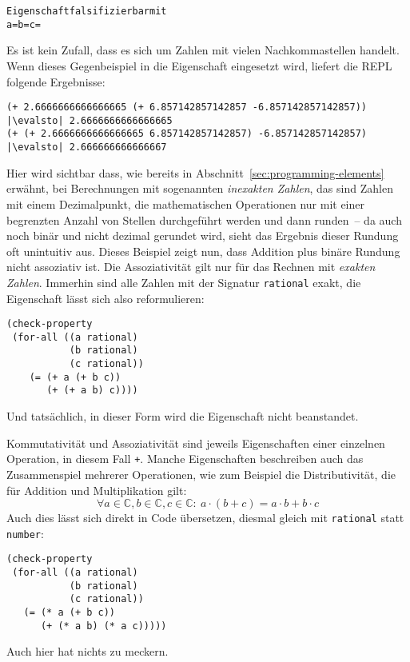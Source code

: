%
\begin{alltt}
Eigenschaft falsifizierbar mit
  a =  b =  c = 
\end{alltt}
%
Es ist kein Zufall, dass es sich um Zahlen mit vielen Nachkommastellen
handelt.  Wenn dieses Gegenbeispiel in die Eigenschaft eingesetzt
wird, liefert die REPL folgende Ergebnisse:
%
\begin{lstlisting}
(+ 2.6666666666666665 (+ 6.857142857142857 -6.857142857142857))
|\evalsto| 2.6666666666666665
(+ (+ 2.6666666666666665 6.857142857142857) -6.857142857142857)
|\evalsto| 2.666666666666667
\end{lstlisting}
%
Hier wird sichtbar dass, wie bereits in
Abschnitt~\ref{sec:programming-elements} erwähnt, bei Berechnungen mit
sogenannten \textit{inexakten Zahlen}, das sind
Zahlen mit einem Dezimalpunkt, die mathematischen Operationen nur mit
einer begrenzten Anzahl von Stellen durchgeführt werden und dann runden~-- da
auch noch binär und nicht dezimal gerundet wird, sieht das Ergebnis
dieser Rundung oft unintuitiv aus.  Dieses Beispiel zeigt nun, dass
Addition plus binäre Rundung nicht assoziativ ist.  Die Assoziativität
gilt nur für das Rechnen mit \textit{exakten Zahlen}.  Immerhin sind alle Zahlen mit der Signatur
\lstinline{rational} exakt, die
Eigenschaft lässt sich also reformulieren:
%
\begin{lstlisting}
(check-property
 (for-all ((a rational)
           (b rational)
           (c rational))
    (= (+ a (+ b c))
       (+ (+ a b) c))))
\end{lstlisting}
%
Und tatsächlich, in dieser Form wird die Eigenschaft nicht
beanstandet.

Kommutativität und Assoziativität sind jeweils Eigenschaften einer
einzelnen Operation, in diesem Fall \lstinline{+}.  Manche Eigenschaften
beschreiben auch das Zusammenspiel mehrerer Operationen, wie zum
Beispiel die Distributivität, die für Addition und Multiplikation
gilt:
%
\begin{displaymath}
\forall a \in \mathbb{C}, b \in \mathbb{C}, c \in \mathbb{C}:\
a\cdot(b+c) = a\cdot b + b\cdot c
\end{displaymath}
%
Auch dies lässt sich direkt in Code übersetzen, diesmal gleich mit
\lstinline{rational} statt \lstinline{number}:
%
\begin{lstlisting}
(check-property
 (for-all ((a rational)
           (b rational)
           (c rational))
   (= (* a (+ b c))
      (+ (* a b) (* a c)))))
\end{lstlisting}
%
Auch hier hat \drscheme{} nichts zu meckern.

